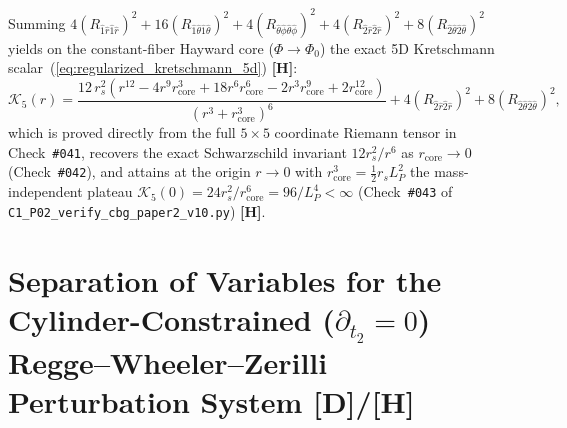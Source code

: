 \documentclass[11pt,a4paper]{article}
\newcommand{\catD}{\textbf{\textcolor{blue!75!black}{[D]}}}
\newcommand{\catH}{\textbf{\textcolor{orange!85!black}{[H]}}}
\theoremstyle{plain}
\theoremstyle{definition}
\theoremstyle{remark}
\numberwithin{equation}{section}
\begin{document}
Summing $4(R_{\hat{1}\hat{r}\hat{1}\hat{r}})^2 + 16(R_{\hat{1}\hat{\theta}\hat{1}\hat{\theta}})^2 + 4(R_{\hat{\theta}\hat{\phi}\hat{\theta}\hat{\phi}})^2 + 4(R_{\hat{2}\hat{r}\hat{2}\hat{r}})^2 + 8(R_{\hat{2}\hat{\theta}\hat{2}\hat{\theta}})^2$ yields on the constant-fiber Hayward core ($\Phi \to \Phi_0$) the exact 5D Kretschmann scalar~(\ref{eq:regularized_kretschmann_5d}) \catH:
\begin{equation}
\mathcal{K}_5(r) = \frac{12\,r_s^2 \left(r^{12} - 4r^9 r_{\text{core}}^3 + 18r^6 r_{\text{core}}^6 - 2r^3 r_{\text{core}}^9 + 2r_{\text{core}}^{12}\right)}{\left(r^3 + r_{\text{core}}^3\right)^6} + 4\left(R_{\hat{2}\hat{r}\hat{2}\hat{r}}\right)^2 + 8\left(R_{\hat{2}\hat{\theta}\hat{2}\hat{\theta}}\right)^2,
\label{eq:app_kretschmann_sum}
\end{equation}
which is proved directly from the full $5\times 5$ coordinate Riemann tensor in Check~\texttt{\#041}, recovers the exact Schwarzschild invariant $12 r_s^2/r^6$ as $r_{\text{core}} \to 0$ (Check~\texttt{\#042}), and attains at the origin $r \to 0$ with $r_{\text{core}}^3 = \frac{1}{2}r_s L_P^2$ the mass-independent plateau $\mathcal{K}_5(0) = 24 r_s^2 / r_{\text{core}}^6 = 96 / L_P^4 < \infty$ (Check~\texttt{\#043} of \allowbreak\texttt{C1\_P02\_verify\_cbg\_paper2\_v10.py}) \catH.

\section{\texorpdfstring{Separation of Variables for the Cylinder-Constrained ($\partial_{t_2} = 0$) Regge--Wheeler--Zerilli Perturbation System \catD/\catH}{Separation of Variables for the Cylinder-Constrained Regge-Wheeler-Zerilli Perturbation System}}
\label{app:rw_zerilli_separation}
\end{document}
